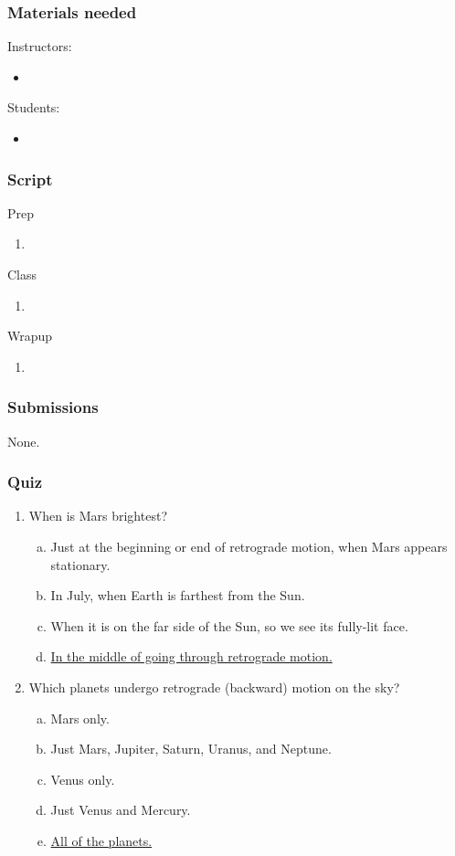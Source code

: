 \documentclass[12pt]{article}
\begin{document}
\subsubsection{Materials needed}
Instructors:
\begin{itemize}
  \item 
\end{itemize}
Students:
\begin{itemize}
  \item 
\end{itemize}

\subsubsection{Script}
Prep
\begin{enumerate}
\item
\end{enumerate}
Class
\begin{enumerate}
\item
\end{enumerate}
Wrapup
\begin{enumerate}
\item
\end{enumerate}

\subsubsection{Submissions}
None.

\subsubsection{Quiz}
\begin{enumerate}
\item
When is Mars brightest?
\begin{enumerate}[a.]
    \item Just at the beginning or end of retrograde motion, when Mars appears stationary.
    \item In July, when Earth is farthest from the Sun.
    \item When it is on the far side of the Sun, so we see its fully-lit face.
    \item \underline{In the middle of going through retrograde motion.}
\end{enumerate}
\item
Which planets undergo retrograde (backward) motion on the sky?
\begin{enumerate}[a.]
    \item Mars only.
    \item Just Mars, Jupiter, Saturn, Uranus, and Neptune.
    \item Venus only.
    \item Just Venus and Mercury.
    \item \underline{All of the planets.}
\end{enumerate}
\end{enumerate}
\end{document}
